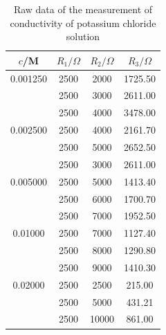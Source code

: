 \documentclass[%
 reprint,
 amsmath,amssymb,
 aps,
]{revtex4-1}
\begin{document}
\begin{table}
\centering
\caption{Raw data of the measurement of conductivity of potassium chloride solution}
\begin{tabular}{cccc}\hline
$c$/M & $R_1/\Omega$ &$R_2/\Omega$ & $R_3/\Omega$ \\\hline 
 0.001250 & 2500 & 2000 & 1725.50 \\
  & 2500 & 3000 & 2611.00 \\
  & 2500 & 4000 & 3478.00 \\\hline
0.002500 & 2500 & 4000 & 2161.70 \\
			 & 2500 & 5000 & 2652.50 \\
			 &2500 & 3000 & 2611.00 \\\hline
 0.005000 & 2500 & 5000 & 1413.40 \\
			 & 2500 & 6000 & 1700.70 \\
 			& 2500 & 7000 & 1952.50 \\\hline
0.01000 & 2500 & 7000 & 1127.40 \\
 				& 2500 & 8000 & 1290.80 \\
				 & 2500 & 9000 & 1410.30 \\\hline
 0.02000 & 2500 & 2500 & 215.00 \\
  & 2500 & 5000 & 431.21 \\
  & 2500 & 10000 & 861.00 \\\hline
\end{tabular}
\label{kcldata}
\end{table}
\end{document}
